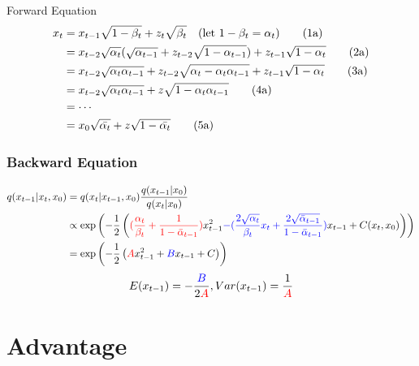 \documentclass[aspectratio=169]{beamer}
\begin{document}
\begin{frame}{Forward Equation}
    \begin{align*}
        x_t & = x_{t-1} \sqrt{1-\beta_t}+ z_t\sqrt{\beta_t} \ \ \ ({\rm let\ } 1-\beta_t = \alpha_t) \tag{1a}                              \\
            & = x_{t-2} \sqrt{\alpha_t}(\sqrt{\alpha_{t-1}} + z_{t-2} \sqrt{1-\alpha_{t-1}}) + z_{t-1}\sqrt{1-\alpha_t}   \tag{2a}         \\
            & = x_{t-2} \sqrt{\alpha_t\alpha_{t-1}}  + z_{t-2} \sqrt{\alpha_t - \alpha_t\alpha_{t-1}} + z_{t-1} \sqrt{1-\alpha_t} \tag{3a} \\
            & = x_{t-2} \sqrt{\alpha_t\alpha_{t-1}} + z\sqrt{1-\alpha_t\alpha_{t-1}}                                          \tag{4a}     \\
            & = \cdots                                                                                                                     \\
            & = x_0 \sqrt{\bar{\alpha_t}} + z\sqrt{1-\bar{\alpha_t}}\tag{5a}
    \end{align*}
\end{frame}


\begin{frame}
    \frametitle{Backward Equation}
    \begin{align*}
        q(x_{t-1} | x_t, x_0) & = q(x_t | x_{t-1}, x_0) \frac{q(x_{t-1}|x_0)}{q(x_t|x_0)} \\
                              & \propto \exp\left(
        - \frac 12 \left(
        \textcolor{red} { (\frac{\alpha_t}{\beta_t}
            + \frac 1{1-\bar{\alpha}_{t-1}}) } x_{t-1}^2
        \textcolor{blue}{ - (\frac{2\sqrt{\alpha_t}}{\beta_t}x_t
            + \frac{2\sqrt{\bar{\alpha}_{t-1}}} {1-\bar{\alpha}_{t-1}} )} x_{t-1}
        +C(x_t, x_0) \right)
        \right)                                                                           \\
                              & = \exp \left ( -\frac12
        \left ( \textcolor{red}{A} x_{t-1}^2 + \textcolor{blue}{B} x_{t-1} + C \right )
        \right )
    \end{align*}
    \begin{equation}
        E (x_{t-1}) = -\frac{\textcolor{blue}{B}}{2\textcolor{red}{A}}, Var(x_{t-1}) = \frac {1}{\textcolor{red}{A}}
    \end{equation}
\end{frame}
\section{Advantage}
\end{document}
